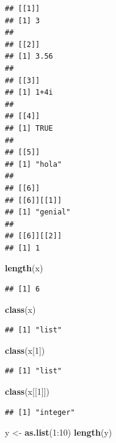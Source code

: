 \documentclass[]{article}
\newenvironment{Shaded}{\begin{snugshade}}{\end{snugshade}}
\newcommand{\KeywordTok}[1]{\textcolor[rgb]{0.13,0.29,0.53}{\textbf{{#1}}}}
\newcommand{\DecValTok}[1]{\textcolor[rgb]{0.00,0.00,0.81}{{#1}}}
\newcommand{\StringTok}[1]{\textcolor[rgb]{0.31,0.60,0.02}{{#1}}}
\newcommand{\NormalTok}[1]{{#1}}
\begin{document}
\begin{verbatim}
## [[1]]
## [1] 3
## 
## [[2]]
## [1] 3.56
## 
## [[3]]
## [1] 1+4i
## 
## [[4]]
## [1] TRUE
## 
## [[5]]
## [1] "hola"
## 
## [[6]]
## [[6]][[1]]
## [1] "genial"
## 
## [[6]][[2]]
## [1] 1
\end{verbatim}

\begin{Shaded}
\begin{Highlighting}[]
\KeywordTok{length}\NormalTok{(x)}
\end{Highlighting}
\end{Shaded}

\begin{verbatim}
## [1] 6
\end{verbatim}

\begin{Shaded}
\begin{Highlighting}[]
\KeywordTok{class}\NormalTok{(x)}
\end{Highlighting}
\end{Shaded}

\begin{verbatim}
## [1] "list"
\end{verbatim}

\begin{Shaded}
\begin{Highlighting}[]
\KeywordTok{class}\NormalTok{(x[}\DecValTok{1}\NormalTok{])}
\end{Highlighting}
\end{Shaded}

\begin{verbatim}
## [1] "list"
\end{verbatim}

\begin{Shaded}
\begin{Highlighting}[]
\KeywordTok{class}\NormalTok{(x[[}\DecValTok{1}\NormalTok{]])}
\end{Highlighting}
\end{Shaded}

\begin{verbatim}
## [1] "integer"
\end{verbatim}

\begin{Shaded}
\begin{Highlighting}[]
\NormalTok{y <-}\StringTok{ }\KeywordTok{as.list}\NormalTok{(}\DecValTok{1}\NormalTok{:}\DecValTok{10}\NormalTok{)}
\KeywordTok{length}\NormalTok{(y)}
\end{Highlighting}
\end{Shaded}
\end{document}
